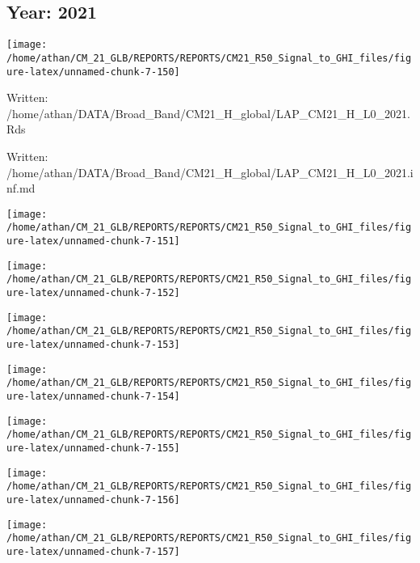 \documentclass[
  11pt,
  a4paper,oneside]{article}
\begin{document}
\newpage

\hypertarget{year-2021}{%
\subsection{Year: 2021}\label{year-2021}}

\begin{center}\texttt{[image: /home/athan/CM\_21\_GLB/REPORTS/REPORTS/CM21\_R50\_Signal\_to\_GHI\_files/figure-latex/unnamed-chunk-7-150]} \end{center}

Written: /home/athan/DATA/Broad\_Band/CM21\_H\_global/LAP\_CM21\_H\_L0\_2021.Rds

Written: /home/athan/DATA/Broad\_Band/CM21\_H\_global/LAP\_CM21\_H\_L0\_2021.inf.md

\begin{center}\texttt{[image: /home/athan/CM\_21\_GLB/REPORTS/REPORTS/CM21\_R50\_Signal\_to\_GHI\_files/figure-latex/unnamed-chunk-7-151]} \end{center}

\begin{center}\texttt{[image: /home/athan/CM\_21\_GLB/REPORTS/REPORTS/CM21\_R50\_Signal\_to\_GHI\_files/figure-latex/unnamed-chunk-7-152]} \end{center}

\begin{center}\texttt{[image: /home/athan/CM\_21\_GLB/REPORTS/REPORTS/CM21\_R50\_Signal\_to\_GHI\_files/figure-latex/unnamed-chunk-7-153]} \end{center}

\begin{center}\texttt{[image: /home/athan/CM\_21\_GLB/REPORTS/REPORTS/CM21\_R50\_Signal\_to\_GHI\_files/figure-latex/unnamed-chunk-7-154]} \end{center}

\begin{center}\texttt{[image: /home/athan/CM\_21\_GLB/REPORTS/REPORTS/CM21\_R50\_Signal\_to\_GHI\_files/figure-latex/unnamed-chunk-7-155]} \end{center}

\begin{center}\texttt{[image: /home/athan/CM\_21\_GLB/REPORTS/REPORTS/CM21\_R50\_Signal\_to\_GHI\_files/figure-latex/unnamed-chunk-7-156]} \end{center}

\begin{center}\texttt{[image: /home/athan/CM\_21\_GLB/REPORTS/REPORTS/CM21\_R50\_Signal\_to\_GHI\_files/figure-latex/unnamed-chunk-7-157]} \end{center}
\end{document}
